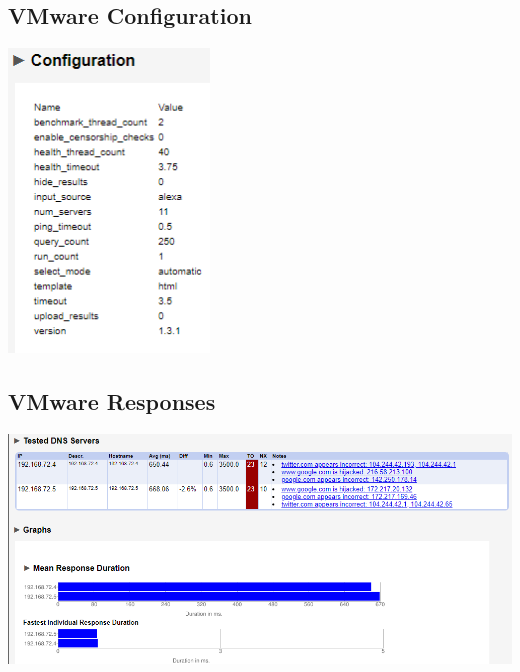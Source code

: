 \documentclass[12pt,twoside]{book}
\begin{document}
\subsection{VMware Configuration}
\includegraphics[width=0.40\textwidth]{Appendicies/VMwareTest3Config.PNG}

\subsection{VMware Responses}
\includegraphics[width=\textwidth]{Appendicies/VMwareTest3Result.PNG}
\end{document}
